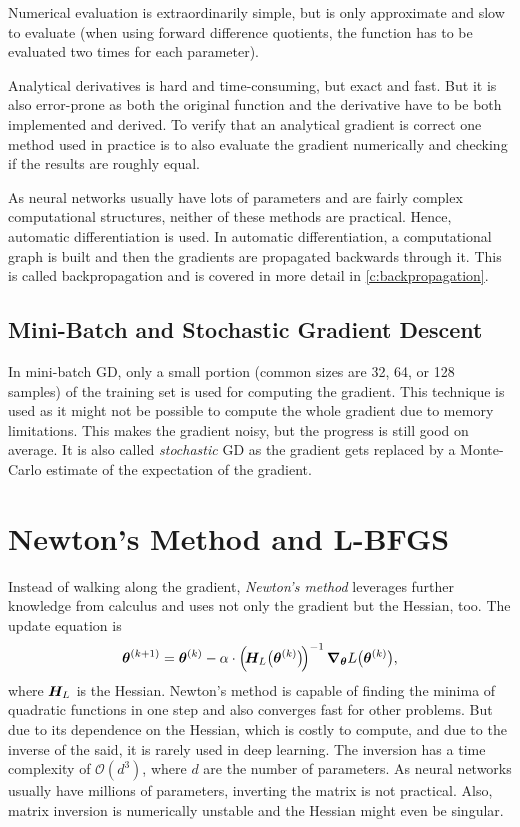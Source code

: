 			Numerical evaluation is extraordinarily simple, but is only approximate and slow to evaluate (when using forward difference quotients, the function has to be evaluated two times for each parameter).

			Analytical derivatives is hard and time-consuming, but exact and fast. But it is also error-prone as both the original function and the derivative have to be both implemented and derived. To verify that an analytical gradient is correct one method used in practice is to also evaluate the gradient numerically and checking if the results are roughly equal.

			As neural networks usually have lots of parameters and are fairly complex computational structures, neither of these methods are practical. Hence, automatic differentiation is used. In automatic differentiation, a computational graph is built and then the gradients are propagated backwards through it. This is called backpropagation and is covered in more detail in \autoref{c:backpropagation}.

		\subsection{Mini-Batch and Stochastic Gradient Descent}
			In mini-batch GD, only a small portion (common sizes are \num{32}, \num{64}, or \num{128} samples) of the training set is used for computing the gradient. This technique is used as it might not be possible to compute the whole gradient due to memory limitations. This makes the gradient noisy, but the progress is still good on average. It is also called \emph{stochastic} GD as the gradient gets replaced by a Monte-Carlo estimate of the expectation of the gradient.

	\section{Newton's Method and L-BFGS}
		Instead of walking along the gradient, \emph{Newton's method} leverages further knowledge from calculus and uses not only the gradient but the Hessian, too. The update equation is
		\begin{equation}
			\bm{\theta}^{(k + 1)} = \bm{\theta}^{(k)} - \alpha \cdot \Big(\!\bm{H}_L\big( \bm{\theta}^{(k)} \big)\!\Big)^{-1} \, \grad_{\bm{\theta}} L\big( \bm{\theta}^{(k)} \big),
		\end{equation}
		where \(\bm{H}_L\) is the Hessian. Newton's method is capable of finding the minima of quadratic functions in one step and also converges fast for other problems. But due to its dependence on the Hessian, which is costly to compute, and due to the inverse of the said, it is rarely used in deep learning. The inversion has a time complexity of \( \mathcal{O}(d^3) \), where \(d\) are the number of parameters. As neural networks usually have millions of parameters, inverting the matrix is not practical. Also, matrix inversion is numerically unstable and the Hessian might even be singular.

